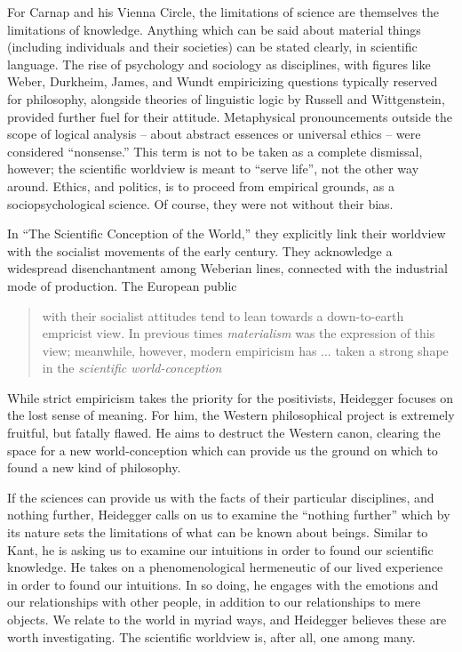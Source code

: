 \documentclass[leqno, 12pt]{turabian-researchpaper}
\begin{document}
	For Carnap and his Vienna Circle, the limitations of science are themselves the
	limitations of knowledge. Anything which can be said about material things (including
	individuals and their societies) can be stated clearly, in scientific language.
	The rise of psychology and sociology as disciplines, with figures like Weber,
	Durkheim, James, and Wundt empiricizing questions typically reserved for
	philosophy, alongside theories of linguistic logic by Russell and Wittgenstein,
	provided further fuel for their attitude. Metaphysical pronouncements outside the
	scope of logical analysis -- about abstract essences or universal ethics -- were
	considered \enquote{nonsense.} This term is not to be taken as a complete
	dismissal, however; the scientific worldview is meant to \enquote{serve life},
	not the other way around. Ethics, and politics, is to proceed from empirical grounds,
	as a sociopsychological science. Of course, they were not without their bias.

	In \enquote{The Scientific Conception of the World,} \nocite{hahn1973} they
	explicitly link their worldview with the socialist movements of the early 
	century. They acknowledge a widespread disenchantment among Weberian lines, connected
	with the industrial mode of production. The European public \blockquote[{\cite[21f]{hahn1973}}]{with their socialist attitudes tend to lean towards a down-to-earth empricist view. In previous times \emph{materialism} was the expression of this view; meanwhile, however, modern empiricism has ... taken a strong shape in the \emph{scientific world-conception}}.

	While strict empiricism takes the priority for the positivists, Heidegger focuses
	on the lost sense of meaning. For him, the Western philosophical project is extremely
	fruitful, but fatally flawed. He aims to destruct the Western canon, clearing
	the space for a new world-conception which can provide us the ground on which
	to found a new kind of philosophy.

	If the sciences can provide us with the facts of their particular disciplines,
	and nothing further, Heidegger calls on us to examine the \enquote{nothing further}
	which by its nature sets the limitations of what can be known about beings.
	Similar to Kant, he is asking us to examine our intuitions in order to found our
	scientific knowledge. He takes on a phenomenological hermeneutic of our lived
	experience in order to found our intuitions. In so doing, he engages with the
	emotions and our relationships with other people, in addition to our relationships
	to mere objects. We relate to the world in myriad ways, and Heidegger believes
	these are worth investigating. The scientific worldview is, after all, one
	among many.
\end{document}
